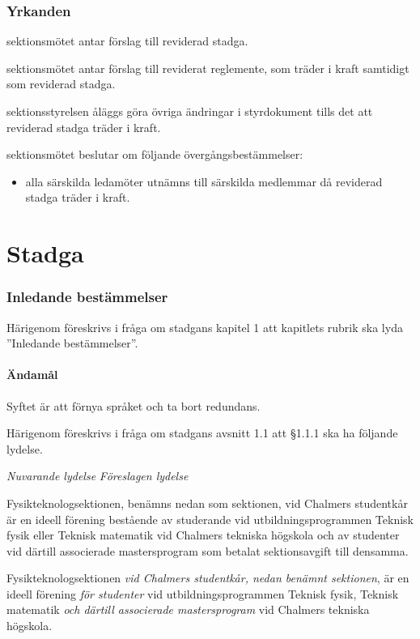 \documentclass{article}
\newenvironment{lydelse}
    {\begin{paracol}{2}%
        \emph{Nuvarande lydelse}%
        \switchcolumn%
        \emph{Föreslagen lydelse}%
    \end{paracol}%
    \begin{enumerate}[label=\thesubsection.\arabic*]%
    \begin{paracol}{2}%
    }{\end{paracol}\end{enumerate}}
\begin{document}
\section*{Yrkanden}
\begin{beslut}
	\item sektionsmötet antar förslag till reviderad stadga.
	\item sektionsmötet antar förslag till reviderat reglemente, som träder i kraft samtidigt som reviderad stadga.
	\item sektionsstyrelsen åläggs göra övriga ändringar i styrdokument tills det att reviderad stadga träder i kraft.
	\item sektionsmötet beslutar om följande övergångsbestämmelser:
	\begin{itemize}
        \item alla särskilda ledamöter utnämns till särskilda medlemmar då reviderad stadga träder i kraft.
	\end{itemize}
\end{beslut}

\tableofcontents
\clearpage


\part{Stadga}
\section{Inledande bestämmelser}
Härigenom föreskrivs i fråga om stadgans kapitel 1 att kapitlets rubrik ska lyda ''Inledande bestämmelser''.


\subsection{Ändamål}
Syftet är att förnya språket och ta bort redundans.

Härigenom föreskrivs i fråga om stadgans avsnitt 1.1 att \S 1.1.1 ska ha följande lydelse.

\begin{lydelse}
    \item Fysikteknologsektionen, benämns nedan som sektionen, vid Chalmers studentkår är en ideell förening bestående av studerande vid utbildningsprogrammen Teknisk fysik eller Teknisk matematik vid Chalmers tekniska högskola och av studenter vid därtill associerade mastersprogram som betalat sektionsavgift till densamma.
  \switchcolumn
    \item Fysikteknologsektionen \emph{vid Chalmers studentkår, nedan benämnt sektionen}, är en ideell förening \emph{för studenter} vid utbildningsprogrammen Teknisk fysik, Teknisk matematik \emph{och därtill associerade mastersprogram} vid Chalmers tekniska högskola.
\end{lydelse}
\end{document}
